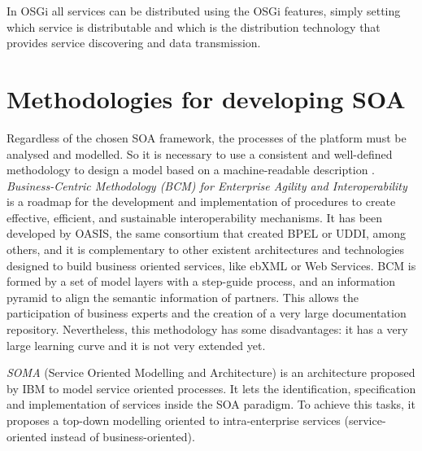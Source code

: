 In OSGi all services can be distributed using the OSGi
features, simply setting which service is distributable and which is
the distribution technology that provides service discovering and data
transmission.   %

\section{Methodologies for developing SOA}
\label{chap:soa:methodologies}
Regardless of the chosen SOA framework, the processes %
 of the platform must be analysed and modelled. So it is necessary to use a consistent and well-defined methodology to design a model based on a machine-readable description \cite{Garcia09UMM}. {\em Business-Centric Methodology (BCM) for Enterprise Agility and Interoperability} \cite{Oasis03BCM} is a roadmap for the development and implementation of procedures to create effective, efficient, and sustainable interoperability mechanisms. It has been developed by OASIS, the same consortium that created BPEL or UDDI, among others, and it is complementary to other existent architectures and technologies designed to build business oriented services, like ebXML or Web Services. BCM is formed by a set of model layers with a step-guide process, and an information pyramid to align the semantic information of partners. This allows the participation of business experts and the creation of a very large documentation repository. Nevertheless, this methodology has some disadvantages: it has a very large learning curve and it is not very extended yet. 

{\em SOMA} (Service Oriented Modelling and Architecture)
\cite{Arsanjani2008SOMA} is an architecture proposed by IBM to model
service oriented processes. It lets the identification, specification
and implementation of services inside the SOA paradigm. To achieve
this tasks, it proposes a top-down modelling oriented to
intra-enterprise services (service-oriented instead of
business-oriented). %

